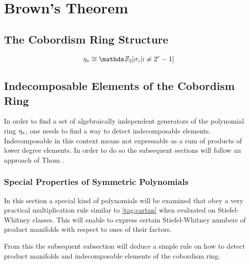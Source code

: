 % 

\chapter{Brown's Theorem}

\section{The Cobordism Ring Structure}

\begin{LemDef} %
\end{LemDef}

\begin{Thm} %
  \begin{gather*}
    \c_* \cong \Zmod2[\sigma_i| i\neq 2^r-1]
  \end{gather*}
\end{Thm}


\section{Indecomposable Elements of the Cobordism Ring}
In order to find a set of algebraically independent generators of the
polynomial ring $\eta_*$, one needs to find a way to detect
indecomposable elements. Indecomposable in this context means not
expressable as a sum of products of lower degree elements.
In order to do so the subsequent sections will follow an approach of
Thom
\cite[Chapters~IV.5 and~IV.6]{thom}.


\subsection{Special Properties of Symmetric Polynomials}
In this section a special kind of polynomials will be examined that
obey a very practical multiplication rule similar to \ref{tag:cartan}
when evaluated on Stiefel-Whitney classes. This will enable to express
certain Stiefel-Whitney numbers of product manifolds with respect to
ones of their factors.

From this the subsequent subsection will deduce a simple rule on how to
detect product manifolds and indecomposable elements of the cobordism
ring.

